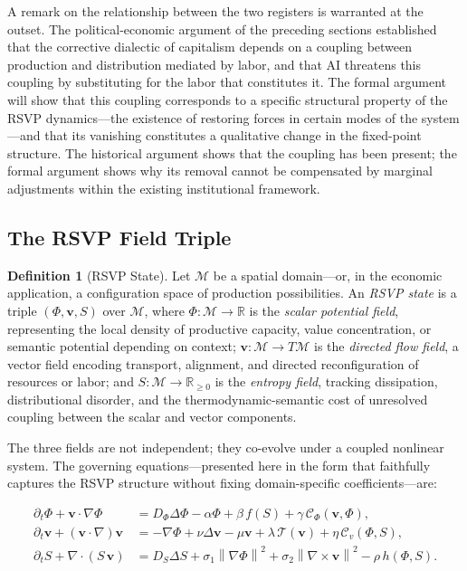 \documentclass[11pt, a4paper]{article}
\theoremstyle{plain}
\theoremstyle{definition}
\newtheorem{definition}[theorem]{Definition}
\newcommand{\Phifield}{\Phi}
\newcommand{\vfield}{\mathbf{v}}
\newcommand{\Sfield}{S}
\newcommand{\statespace}{\mathcal{M}}
\newcommand{\norm}[1]{\left\lVert #1 \right\rVert}
\begin{document}
A remark on the relationship between the two registers is warranted at the
outset. The political-economic argument of the preceding sections established
that the corrective dialectic of capitalism depends on a coupling between
production and distribution mediated by labor, and that AI threatens this
coupling by substituting for the labor that constitutes it. The formal
argument will show that this coupling corresponds to a specific structural
property of the RSVP dynamics---the existence of restoring forces in certain
modes of the system---and that its vanishing constitutes a qualitative change
in the fixed-point structure. The historical argument shows that the coupling
has been present; the formal argument shows why its removal cannot be
compensated by marginal adjustments within the existing institutional framework.

\subsection{The RSVP Field Triple}

\begin{definition}[RSVP State]
Let $\statespace$ be a spatial domain---or, in the economic application, a
configuration space of production possibilities. An \emph{RSVP state} is a
triple $(\Phifield, \vfield, \Sfield)$ over $\statespace$, where
$\Phifield : \statespace \to \mathbb{R}$ is the \emph{scalar potential field},
representing the local density of productive capacity, value concentration, or
semantic potential depending on context;
$\vfield : \statespace \to T\statespace$ is the \emph{directed flow field},
a vector field encoding transport, alignment, and directed reconfiguration of
resources or labor; and
$\Sfield : \statespace \to \mathbb{R}_{\geq 0}$ is the \emph{entropy field},
tracking dissipation, distributional disorder, and the thermodynamic-semantic
cost of unresolved coupling between the scalar and vector components.
\end{definition}

The three fields are not independent; they co-evolve under a coupled nonlinear
system. The governing equations---presented here in the form that faithfully
captures the RSVP structure without fixing domain-specific coefficients---are:

\begin{align}
  \partial_t \Phifield + \vfield \cdot \nabla \Phifield
    &= D_\Phi \Delta \Phifield
      - \alpha \Phifield
      + \beta\, f(\Sfield)
      + \gamma\, \mathcal{C}_\Phi(\vfield, \Phifield), \label{eq:phi} \\[6pt]
  \partial_t \vfield + (\vfield \cdot \nabla)\vfield
    &= -\nabla \Phifield
      + \nu \Delta \vfield
      - \mu \vfield
      + \lambda\, \mathcal{T}(\vfield)
      + \eta\, \mathcal{C}_v(\Phifield, \Sfield), \label{eq:v} \\[6pt]
  \partial_t \Sfield + \nabla \cdot (\Sfield\, \vfield)
    &= D_S \Delta \Sfield
      + \sigma_1 \norm{\nabla \Phifield}^2
      + \sigma_2 \norm{\nabla \times \vfield}^2
      - \rho\, h(\Phifield, \Sfield). \label{eq:S}
\end{align}
\end{document}
